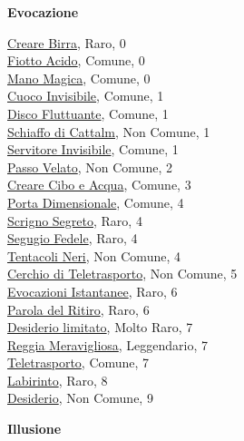 \begin{multicols}{3}
{{\medskip\textbf{Evocazione}

\hyperlink{Creare Birra}{Creare Birra}, Raro, 0\\
\hyperlink{Fiotto Acido}{Fiotto Acido}, Comune, 0\\
\hyperlink{Mano Magica}{Mano Magica}, Comune, 0\\
\hyperlink{Cuoco Invisibile}{Cuoco Invisibile}, Comune, 1\\
\hyperlink{Disco Fluttuante}{Disco Fluttuante}, Comune, 1\\
\hyperlink{Schiaffo di Cattalm}{Schiaffo di Cattalm}, Non Comune, 1\\
\hyperlink{Servitore Invisibile}{Servitore Invisibile}, Comune, 1\\
\hyperlink{Passo Velato}{Passo Velato}, Non Comune, 2\\
\hyperlink{Creare Cibo e Acqua}{Creare Cibo e Acqua}, Comune, 3\\
\hyperlink{Porta Dimensionale}{Porta Dimensionale}, Comune, 4\\
\hyperlink{Scrigno Segreto}{Scrigno Segreto}, Raro, 4\\
\hyperlink{Segugio Fedele}{Segugio Fedele}, Raro, 4\\
\hyperlink{Tentacoli Neri}{Tentacoli Neri}, Non Comune, 4\\
\hyperlink{Cerchio di Teletrasporto}{Cerchio di Teletrasporto}, Non Comune, 5\\
\hyperlink{Evocazioni Istantanee}{Evocazioni Istantanee}, Raro, 6\\
\hyperlink{Parola del Ritiro}{Parola del Ritiro}, Raro, 6\\
\hyperlink{Desiderio limitato}{Desiderio limitato}, Molto Raro, 7\\
\hyperlink{Reggia Meravigliosa}{Reggia Meravigliosa}, Leggendario, 7\\
\hyperlink{Teletrasporto}{Teletrasporto}, Comune, 7\\
\hyperlink{Labirinto}{Labirinto}, Raro, 8\\
\hyperlink{Desiderio}{Desiderio}, Non Comune, 9

\medskip\textbf{Illusione}

}}
\end{multicols}
